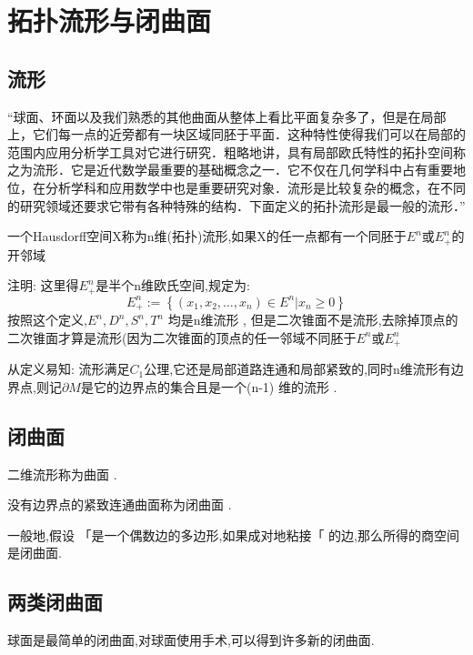 \section{拓扑流形与闭曲面}
\subsection*{流形}
“球面、环面以及我们熟悉的其他曲面从整体上看比平面复杂多了，但是在局部上，它们每一点的近旁都有一块区域同胚于平面．这种特性使得我们可以在局部的范围内应用分析学工具对它进行研究．粗略地讲，具有局部欧氏特性的拓扑空间称之为流形．它是近代数学最重要的基础概念之一．它不仅在几何学科中占有重要地位，在分析学科和应用数学中也是重要研究对象．流形是比较复杂的概念，在不同的研究领域还要求它带有各种特殊的结构．下面定义的拓扑流形是最一般的流形．”
\begin{definition}
    一个Hausdorff空间X称为n维(拓扑)流形,如果X的任一点都有一个同胚于\(E^n\)或\(E^n_{+}\)的开邻域
\end{definition}
\begin{note}
    注明: 这里得\(E^n_{+}\)是半个n维欧氏空间,规定为: 
    \[E^n_{+} := \left\{(x_1,x_2 ,\dots ,x_n) \in E^n | x_n \geq 0\right\}\]
    按照这个定义,\(E^n ,D^n, S^n , T^n\) 均是n维流形 , 但是二次锥面不是流形,去除掉顶点的二次锥面才算是流形(因为二次锥面的顶点的任一邻域不同胚于\(E^n \text{或}E^n_{+}\)
\end{note}
从定义易知: 流形满足\(C_1\)公理,它还是局部道路连通和局部紧致的,同时n维流形有边界点,则记\(\partial M \)是它的边界点的集合且是一个(n-1) 维的流形 .
\subsection*{闭曲面}
二维流形称为曲面 . 
\begin{definition}
    没有边界点的紧致连通曲面称为闭曲面 . 
\end{definition}
\begin{theorem}
    一般地,假设 「是一个偶数边的多边形,如果成对地粘接「 的边,那么所得的商空间是闭曲面.
\end{theorem}
\subsection*{两类闭曲面}
球面是最简单的闭曲面,对球面使用手术,可以得到许多新的闭曲面.
